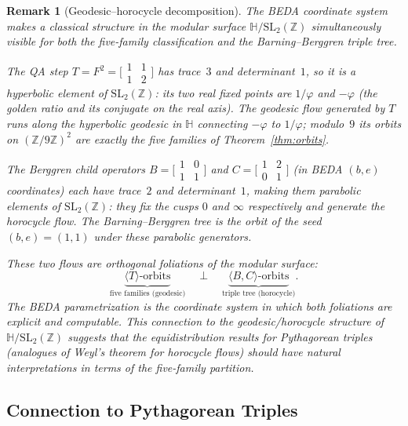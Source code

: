 \documentclass[12pt]{article}
\newtheorem{remark}{Remark}
\begin{document}
\begin{remark}[Geodesic--horocycle decomposition]\label{rem:geodesic}
The BEDA coordinate system makes a classical structure in the modular surface $\mathbb{H}/\mathrm{SL}_2(\mathbb{Z})$ simultaneously visible for both the five-family classification and the Barning--Berggren triple tree.

The QA step $T = F^2 = \bigl[\begin{smallmatrix}1&1\\1&2\end{smallmatrix}\bigr]$ has trace~$3$ and determinant~$1$, so it is a \emph{hyperbolic} element of $\mathrm{SL}_2(\mathbb{Z})$: its two real fixed points are $1/\varphi$ and $-\varphi$ (the golden ratio and its conjugate on the real axis).  The \emph{geodesic flow} generated by $T$ runs along the hyperbolic geodesic in $\mathbb{H}$ connecting $-\varphi$ to $1/\varphi$; modulo~$9$ its orbits on $(\mathbb{Z}/9\mathbb{Z})^2$ are exactly the five families of Theorem~\ref{thm:orbits}.

The Berggren child operators $B = \bigl[\begin{smallmatrix}1&0\\1&1\end{smallmatrix}\bigr]$ and $C = \bigl[\begin{smallmatrix}1&2\\0&1\end{smallmatrix}\bigr]$ (in BEDA $(b,e)$ coordinates) each have trace~$2$ and determinant~$1$, making them \emph{parabolic} elements of $\mathrm{SL}_2(\mathbb{Z})$: they fix the cusps $0$ and $\infty$ respectively and generate the \emph{horocycle flow}.  The Barning--Berggren tree is the orbit of the seed $(b,e)=(1,1)$ under these parabolic generators.

These two flows are \emph{orthogonal foliations} of the modular surface:
\[
  \underbrace{\langle T \rangle\text{-orbits}}_{\text{five families (geodesic)}}
  \quad \perp \quad
  \underbrace{\langle B, C \rangle\text{-orbits}}_{\text{triple tree (horocycle)}}.
\]
The BEDA parametrization is the coordinate system in which both foliations are explicit and computable.  This connection to the geodesic/horocycle structure of $\mathbb{H}/\mathrm{SL}_2(\mathbb{Z})$ suggests that the equidistribution results for Pythagorean triples (analogues of Weyl's theorem for horocycle flows) should have natural interpretations in terms of the five-family partition.
\end{remark}

\subsection{Connection to Pythagorean Triples}
\end{document}
